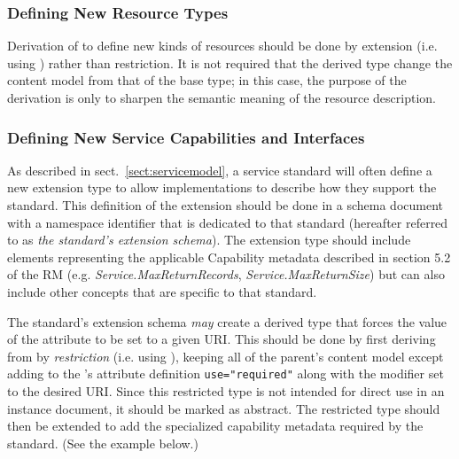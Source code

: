 \documentclass[11pt,a4paper]{ivoa}
\begin{document}
\subsubsection{Defining New Resource Types}
\label{sect:definingresourcetypes}


Derivation of  to define new kinds of
resources should be done by extension (i.e. using 
) rather than restriction.  It is
not required that the derived type change the content model from that
of the  base type; in this case, the purpose
of the derivation is only to sharpen the semantic meaning of the
resource description.  


\subsubsection{Defining New Service Capabilities and Interfaces}
\label{sect:serviceelements}


As described in sect.~\ref{sect:servicemodel}, a service
standard will often define a new  extension
type to allow implementations to describe how they support the
standard.  This definition of the  extension
should be done in a schema document with a namespace identifier that
is dedicated to that standard (hereafter referred to as \emph{the
standard's extension schema}).  The extension type should include
elements representing the applicable Capability metadata described in
section 5.2 of the RM
(e.g. \emph{Service.MaxReturnRecords}, \emph{Service.MaxReturnSize})
but can also include other concepts that are specific to that standard.



The standard's extension schema \emph{may} create a derived
 type that forces the value of the
 attribute to be set to a given URI.  This
should be done by first deriving from  by
\emph{restriction} (i.e. using
), keeping all of the parent's
content model except adding to the 's attribute
definition \verb|use="required"| along with the
 modifier set to the desired URI.  Since this
restricted type is not intended for direct use in an instance
document, it should be marked as abstract.  The restricted type should
then be extended to add the specialized capability metadata required
by the standard.  (See the example below.)  
\end{document}
